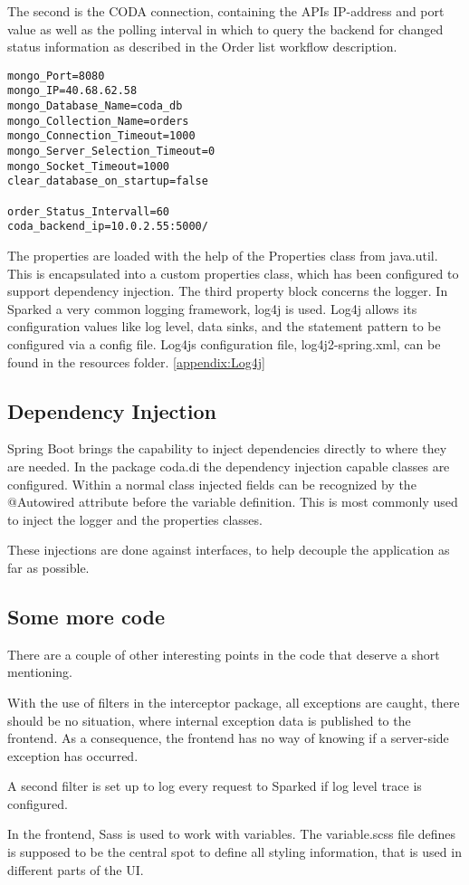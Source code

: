 The second is the CODA connection, containing the APIs IP-address and port value as well as the polling interval in which to query the backend for changed status information as described in the Order list workflow description.

\begin{lstlisting}[caption={The config.properties file.},captionpos=b]
mongo_Port=8080
mongo_IP=40.68.62.58
mongo_Database_Name=coda_db
mongo_Collection_Name=orders
mongo_Connection_Timeout=1000
mongo_Server_Selection_Timeout=0
mongo_Socket_Timeout=1000
clear_database_on_startup=false

order_Status_Intervall=60
coda_backend_ip=10.0.2.55:5000/
\end{lstlisting}

The properties are loaded with the help of the Properties class from java.util. This is encapsulated into a custom properties class, which has been configured to support dependency injection.
The third property block concerns the logger. In Sparked a very common logging framework, log4j is used. Log4j allows its configuration values like log level, data sinks, and the statement pattern to be configured via a config file. Log4js configuration file, log4j2-spring.xml, can be found in the resources folder. \ref{appendix:Log4j}

\subsection{Dependency Injection}
Spring Boot brings the capability to inject dependencies directly to where they are needed. In the package coda.di the dependency injection capable classes are configured. Within a normal class injected fields can be recognized by the @Autowired attribute before the variable definition. This is most commonly used to inject the logger and the properties classes.

These injections are done against interfaces, to help decouple the application as far as possible.

\subsection{Some more code}
There are a couple of other interesting points in the code that deserve a short mentioning. 

With the use of filters in the interceptor package, all exceptions are caught, there should be no situation, where internal exception data is published to the frontend. As a consequence, the frontend has no way of knowing if a server-side exception has occurred. 

A second filter is set up to log every request to Sparked if log level trace is configured. 

In the frontend, Sass is used to work with variables. The variable.scss file defines is supposed to be the central spot to define all styling information, that is used in different parts of the UI. 

